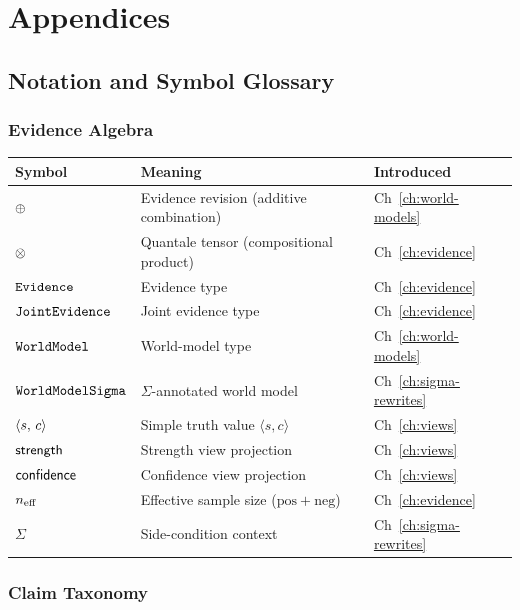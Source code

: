 \documentclass[11pt,openany]{report}
\begin{document}
\part{Appendices}
\label{part:appendices}

\chapter{Notation and Symbol Glossary}
\label{app:notation}

\section*{Evidence Algebra}

\begin{longtable}{@{}lp{}l@{}}
\toprule
Symbol & Meaning & Introduced \\
\midrule
$\oplus$ & Evidence revision (additive combination) & Ch~\ref{ch:world-models} \\
$\otimes$ & Quantale tensor (compositional product) & Ch~\ref{ch:evidence} \\
$\mathtt{Evidence}$ & Evidence type & Ch~\ref{ch:evidence} \\
$\mathtt{JointEvidence}$ & Joint evidence type & Ch~\ref{ch:evidence} \\
$\mathtt{WorldModel}$ & World-model type & Ch~\ref{ch:world-models} \\
$\mathtt{WorldModelSigma}$ & $\Sigma$-annotated world model & Ch~\ref{ch:sigma-rewrites} \\
$\langle s,\, c \rangle$ & Simple truth value $\langle s, c \rangle$ & Ch~\ref{ch:views} \\
$\mathsf{strength}$ & Strength view projection & Ch~\ref{ch:views} \\
$\mathsf{confidence}$ & Confidence view projection & Ch~\ref{ch:views} \\
$n_{\mathrm{eff}}$ & Effective sample size ($\mathrm{pos} + \mathrm{neg}$) & Ch~\ref{ch:evidence} \\
$\Sigma$ & Side-condition context & Ch~\ref{ch:sigma-rewrites} \\
\bottomrule
\end{longtable}

\section*{Claim Taxonomy}
\end{document}
